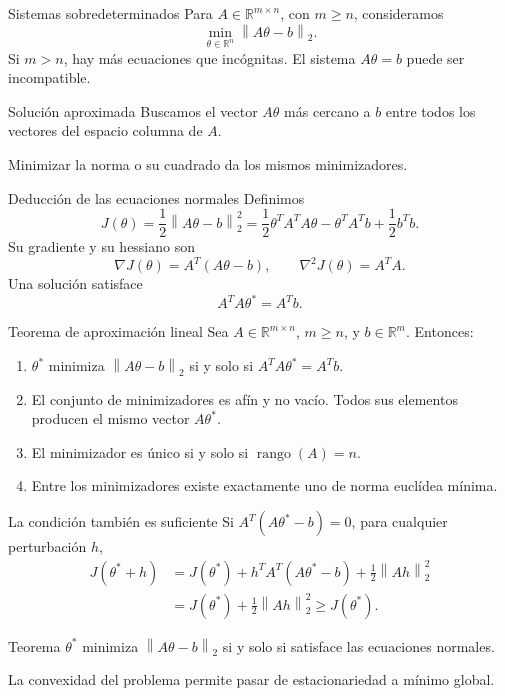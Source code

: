 \documentclass[aspectratio=169,12pt]{beamer}
\newcommand{\R}{\mathbb{R}}
\newcommand{\norm}[1]{\left\lVert#1\right\rVert}
\begin{document}
\begin{frame}{Sistemas sobredeterminados}
Para $A\in\R^{m\times n}$, con $m\geq n$, consideramos
\[
\min_{\theta\in\R^n}\norm{A\theta-b}_2.
\]
Si $m>n$, hay más ecuaciones que incógnitas. El sistema $A\theta=b$ puede
ser incompatible.
\begin{block}{Solución aproximada}
Buscamos el vector $A\theta$ más cercano a $b$ entre todos los vectores del
espacio columna de $A$.
\end{block}
Minimizar la norma o su cuadrado da los mismos minimizadores.
\end{frame}

\begin{frame}{Deducción de las ecuaciones normales}
Definimos
\[
J(\theta)=\frac12\norm{A\theta-b}_2^2
=\frac12\theta^TA^TA\theta-\theta^TA^Tb+\frac12b^Tb.
\]
Su gradiente y su hessiano son
\[
\nabla J(\theta)=A^T(A\theta-b),\qquad
\nabla^2J(\theta)=A^TA.
\]
Una solución satisface
\[
\boxed{A^TA\theta^*=A^Tb.}
\]
\end{frame}

\begin{frame}{Teorema de aproximación lineal}
Sea $A\in\R^{m\times n}$, $m\geq n$, y $b\in\R^m$. Entonces:
\begin{enumerate}
\item $\theta^*$ minimiza $\norm{A\theta-b}_2$ si y solo si
$A^TA\theta^*=A^Tb$.
\item El conjunto de minimizadores es afín y no vacío. Todos sus elementos
producen el mismo vector $A\theta^*$.
\item El minimizador es único si y solo si $\operatorname{rango}(A)=n$.
\item Entre los minimizadores existe exactamente uno de norma euclídea mínima.
\end{enumerate}
\end{frame}

\begin{frame}{La condición también es suficiente}
Si $A^T(A\theta^*-b)=0$, para cualquier perturbación $h$,
\[
\begin{aligned}
J(\theta^*+h)
&=J(\theta^*)+h^TA^T(A\theta^*-b)+\tfrac12\norm{Ah}_2^2\\
&=J(\theta^*)+\tfrac12\norm{Ah}_2^2\geq J(\theta^*).
\end{aligned}
\]
\begin{block}{Teorema}
$\theta^*$ minimiza $\norm{A\theta-b}_2$ si y solo si satisface las ecuaciones normales.
\end{block}
La convexidad del problema permite pasar de estacionariedad a mínimo global.
\end{frame}
\end{document}
